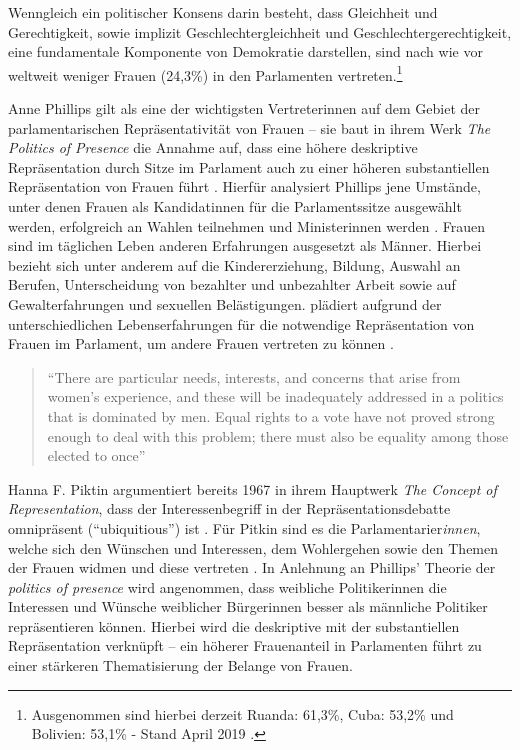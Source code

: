 \documentclass[12pt, 
    twoside=false, 
    bibliography=totoc, 
    numbers=endperiod, 
    headings=normal, 
    toc=chapterentrydotfill
    ]{scrbook}
\begin{document}
Wenngleich ein politischer Konsens darin besteht, dass Gleichheit und Gerechtigkeit, sowie implizit Geschlechtergleichheit und Geschlechtergerechtigkeit, eine fundamentale Komponente von Demokratie darstellen, sind nach wie vor weltweit weniger Frauen (24,3\%) \parencite[]{ipu_2019} in den Parlamenten vertreten.\footnote{Ausgenommen sind hierbei derzeit Ruanda: 61,3\%, Cuba: 53,2\% und Bolivien: 53,1\% - Stand April 2019 \parencite{ipu_2019}.}

Anne Phillips gilt als eine der wichtigsten Vertreterinnen auf dem Gebiet der parlamentarischen Repräsentativität von Frauen -- sie baut in ihrem Werk \emph{The Politics of Presence} \parencite*{phillips_1998} die Annahme auf, dass eine höhere deskriptive Repräsentation durch Sitze im Parlament auch zu einer höheren substantiellen Repräsentation von Frauen führt \parencite[52]{wangnerud_2009}. Hierfür analysiert Phillips jene Umstände, unter denen Frauen als Kandidatinnen für die Parlamentssitze ausgewählt werden, erfolgreich an Wahlen teilnehmen und Ministerinnen werden \parencite[vgl.][416f.]{blaxill_2016}. Frauen sind im täglichen Leben anderen Erfahrungen ausgesetzt als Männer. Hierbei bezieht sich \textcite{phillips_1998} unter anderem auf die Kindererziehung, Bildung, Auswahl an Berufen, Unterscheidung von bezahlter und unbezahlter Arbeit sowie auf Gewalterfahrungen und sexuellen Belästigungen. \textcite{phillips_1998} plädiert aufgrund der unterschiedlichen Lebenserfahrungen für die notwendige Repräsentation von Frauen im Parlament, um andere Frauen vertreten zu können \parencite[vgl.][52]{wangnerud_2009}.

\citereset
\begin{quote}
    \enquote{There are particular needs, interests, and concerns that arise from women's experience, and these will be inadequately addressed in a politics that is dominated by men. Equal rights to a vote have not proved strong enough to deal with this problem; there must also be equality among those elected to once} \parencite[66]{phillips_1998}
\end{quote}

Hanna F. Piktin \parencite*{pitkin_1972} argumentiert bereits 1967 in ihrem Hauptwerk \emph{The Concept of Representation}, dass der Interessenbegriff in der Repräsentationsdebatte omnipräsent (\enquote{ubiquitious}) ist \parencite[69]{wangnerud_2000}. Für Pitkin sind es die Parlamentarier\emph{innen}, welche sich den Wünschen und Interessen, dem Wohlergehen sowie den Themen der Frauen widmen und diese vertreten \parencites[vgl.][413]{blaxill_2016}{pitkin_1972}. In Anlehnung an Phillips' Theorie der \emph{politics of presence} \parencite*{phillips_1998} wird angenommen, dass weibliche Politikerinnen die Interessen und Wünsche weiblicher Bürgerinnen besser als männliche Politiker repräsentieren können. Hierbei wird die deskriptive mit der substantiellen Repräsentation verknüpft \parencite[52]{wangnerud_2009} -- ein höherer Frauenanteil in Parlamenten führt zu einer stärkeren Thematisierung der Belange von Frauen.
\end{document}
